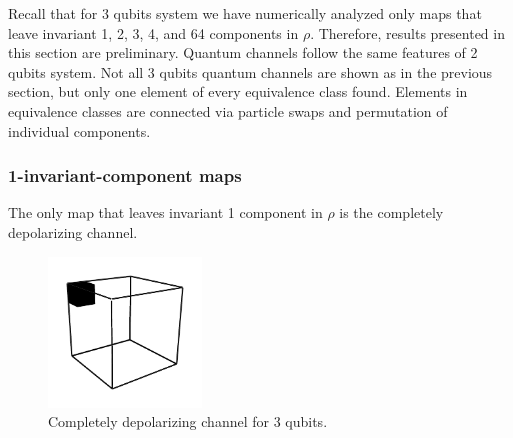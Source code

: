 \documentclass[11pt,dvipsnames]{article} %
\newcommand{\1}{\mathds{1}}
\begin{document}
Recall that for 3 qubits system we have numerically analyzed only maps that
leave invariant 1, 2, 3, 4, and 64 components in $\rho$. Therefore, results
presented in this section are preliminary. Quantum channels follow the same
features of 2 qubits system. Not all 3 qubits quantum channels are shown as in
the previous section, but only one element of every equivalence class found.
Elements in equivalence classes are connected via particle swaps and
permutation of individual components.

\subsubsection*{1-invariant-component maps} %
The only map that leaves invariant 1 component in $\rho$ is the completely
depolarizing channel.
\begin{figure}
	\includegraphics[height=4cm]{img/3q-1c}
	\caption{Completely depolarizing channel for 3 qubits.}
	\label{fig:QC-3q-1c}
\end{figure}
\end{document}
